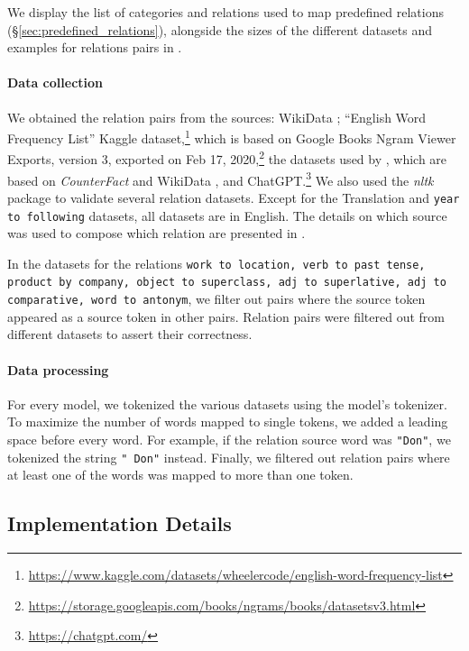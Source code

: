 \documentclass[11pt]{article}
\begin{document}
We display the list of categories and relations used to map predefined relations (\S\ref{sec:predefined_relations}), alongside the sizes of the different datasets and examples for relations pairs in .

\paragraph{Data collection}
We obtained the relation pairs from the sources: WikiData \cite{10.1145/2629489}; ``English Word Frequency List'' Kaggle dataset,\footnote{\url{https://www.kaggle.com/datasets/wheelercode/english-word-frequency-list}} which is based on Google Books Ngram Viewer Exports, version 3, exported on Feb 17, 2020,\footnote{\url{https://storage.googleapis.com/books/ngrams/books/datasetsv3.html}} the datasets used by \citet{hernandez2024linearity}, which are based on \emph{CounterFact} \cite{meng2022locating} and WikiData \cite{10.1145/2629489}, and ChatGPT.\footnote{\url{https://chatgpt.com/}} We also used the \emph{nltk} package \cite{bird-loper-2004-nltk} to validate several relation datasets. Except for the Translation and \texttt{year to following} datasets, all datasets are in English.
The details on which source was used to compose which relation are presented in . 

In the datasets for the relations \texttt{work to location, verb to past tense, product by company, object to superclass, adj to superlative, adj to comparative, word to antonym}, we filter out pairs where the source token appeared as a source token in other pairs. 
Relation pairs were filtered out from different datasets to assert their correctness.

\paragraph{Data processing}
For every model, we tokenized the various datasets using the model's tokenizer. To maximize the number of words mapped to single tokens, we added a leading space before every word. For example, if the relation source word was \texttt{"Don"}, we tokenized the string \texttt{" Don"} instead. Finally, we filtered out relation pairs where at least one of the words was mapped to more than one token.

\subsection{Implementation Details}
\end{document}
